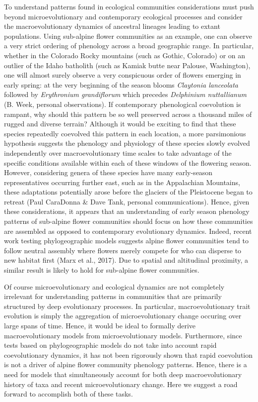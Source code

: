 \documentclass[]{elsarticle} %
\begin{document}
To understand patterns found in ecological communities considerations
must push beyond microevolutionary and contemporary ecological processes
and consider the macroevolutionary dynamics of ancestral lineages
leading to extant populations. Using sub-alpine flower communities as an
example, one can observe a very strict ordering of phenology across a
broad geographic range. In particular, whether in the Colorado Rocky
mountains (such as Gothic, Colorado) or on an outlier of the Idaho
batholith (such as Kamiak butte near Palouse, Washington), one will
almost surely observe a very conspicuous order of flowers emerging in
early spring: at the very beginning of the season blooms \emph{Claytonia
lanceolata} followed by \emph{Erythronium grandiflorum} which precedes
\emph{Delphinium nuttallianum} (B. Week, personal observations). If
contemporary phenological coevolution is rampant, why should this
pattern be so well preserved across a thousand miles of rugged and
diverse terrain? Although it would be exciting to find that these
species repeatedly coevolved this pattern in each location, a more
parsimonious hypothesis suggests the phenology and physiology of these
species slowly evolved independently over macroevolutionary time scales
to take advantage of the specific conditions available within each of
these windows of the flowering season. However, considering genera of
these species have many early-season representatives occurring further
east, such as in the Appalachian Mountains, these adaptations
potentially arose before the glaciers of the Pleistocene began to
retreat (Paul CaraDonna \& Dave Tank, personal communications). Hence,
given these considerations, it appears that an understanding of early
season phenology patterns of sub-alpine flower communities should focus
on how these communities are assembled as opposed to contemporary
evolutionary dynamics. Indeed, recent work testing phylogeographic
models suggests alpine flower communities tend to follow neutral
assembly where flowers merely compete for who can disperse to new
habitat first (Marx et al., 2017). Due to spatial and altitudinal
proximity, a similar result is likely to hold for sub-alpine flower
communities.

Of course microevolutionary and ecological dynamics are not completely
irrelevant for understanding patterns in communities that are primarily
structured by deep evolutionary processes. In particular,
macroevolutionary trait evolution is simply the aggregation of
microevolutionary change occuring over large spans of time. Hence, it
would be ideal to formally derive macroevolutionary models from
microevolutionary models. Furthermore, since tests based on
phylogeographic models do not take into account rapid coevolutionary
dynamics, it has not been rigorously shown that rapid coevolution is not
a driver of alpine flower community phenology patterns. Hence, there is
a need for models that simultaneously account for both deep
macroevolutionary history of taxa and recent microevolutionary change.
Here we suggest a road forward to accomplish both of these tasks.
\end{document}

